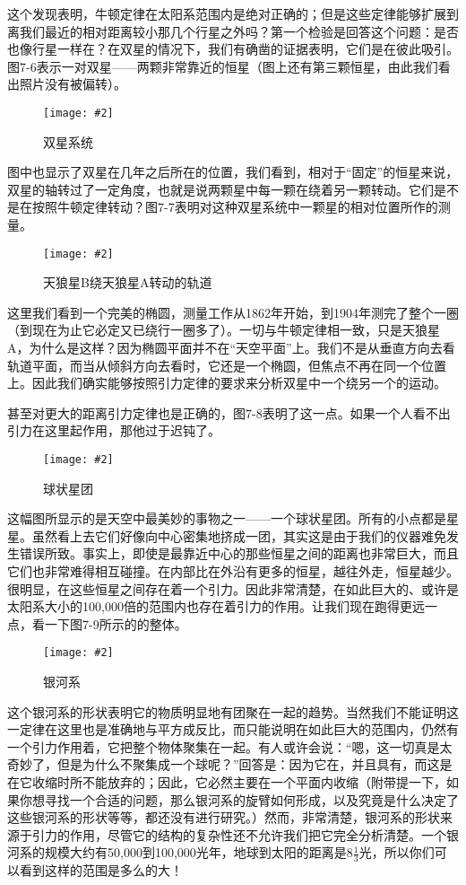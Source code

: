 \documentclass[12pt,oneside]{book}
\newenvironment{fig}[2][1]
{\begin{figure}[H]
\centering
\texttt{[image: \#2]}}
{\end{figure}}
\newenvironment{linefig}[2][1]
{\begin{figure}[H]
\centering
\texttt{[image: \#2]}}
{\end{figure}}
\begin{document}
这个发现表明，牛顿定律在太阳系范围内是绝对正确的；但是这些定律能够扩展到离我们最近的相对距离较小那几个行星之外吗？第一个检验是回答这个问题：是否也像行星一样在？在双星的情况下，我们有确凿的证据表明，它们是在彼此吸引。图7-6表示一对双星——两颗非常靠近的恒星（图上还有第三颗恒星，由此我们看出照片没有被偏转）。
\begin{linefig}{双星系统}
\caption{双星系统}
\label{fig:双星系统}
\end{linefig}
图中也显示了双星在几年之后所在的位置，我们看到，相对于“固定”的恒星来说，双星的轴转过了一定角度，也就是说两颗星中每一颗在绕着另一颗转动。它们是不是在按照牛顿定律转动？图7-7表明对这种双星系统中一颗星的相对位置所作的测量。
\begin{fig}{天狼星B绕天狼星A转动的轨道}
\caption{天狼星B绕天狼星A转动的轨道}
\label{fig:天狼星B绕天狼星A转动的轨道}
\end{fig}
这里我们看到一个完美的椭圆，测量工作从1862年开始，到1904年测完了整个一圈（到现在为止它必定又已绕行一圈多了）。一切与牛顿定律相一致，只是天狼星A，为什么是这样？因为椭圆平面并不在“天空平面”上。我们不是从垂直方向去看轨道平面，而当从倾斜方向去看时，它还是一个椭圆，但焦点不再在同一个位置上。因此我们确实能够按照引力定律的要求来分析双星中一个绕另一个的运动。

甚至对更大的距离引力定律也是正确的，图7-8表明了这一点。如果一个人看不出引力在这里起作用，那他过于迟钝了。
\begin{linefig}{球状星团}
\caption{球状星团}
\label{fig:球状星团}
\end{linefig}
这幅图所显示的是天空中最美妙的事物之一——一个球状星团。所有的小点都是星星。虽然看上去它们好像向中心密集地挤成一团，其实这是由于我们的仪器难免发生错误所致。事实上，即使是最靠近中心的那些恒星之间的距离也非常巨大，而且它们也非常难得相互碰撞。在内部比在外沿有更多的恒星，越往外走，恒星越少。很明显，在这些恒星之间存在着一个引力。因此非常清楚，在如此巨大的、或许是太阳系大小的100,000倍的范围内也存在着引力的作用。让我们现在跑得更远一点，看一下图7-9所示的的整体。
\begin{linefig}{银河系}
\caption{银河系}
\label{fig:银河系}
\end{linefig}
这个银河系的形状表明它的物质明显地有团聚在一起的趋势。当然我们不能证明这一定律在这里也是准确地与平方成反比，而只能说明在如此巨大的范围内，仍然有一个引力作用着，它把整个物体聚集在一起。有人或许会说：“嗯，这一切真是太奇妙了，但是为什么不聚集成一个球呢？”回答是：因为它在，并且具有，而这是在它收缩时所不能放弃的；因此，它必然主要在一个平面内收缩（附带提一下，如果你想寻找一个合适的问题，那么银河系的旋臂如何形成，以及究竟是什么决定了这些银河系的形状等等，都还没有进行研究。）然而，非常清楚，银河系的形状来源于引力的作用，尽管它的结构的复杂性还不允许我们把它完全分析清楚。一个银河系的规模大约有50,000到100,000光年，地球到太阳的距离是$8\frac{1}{3}$光，所以你们可以看到这样的范围是多么的大！
\end{document}
